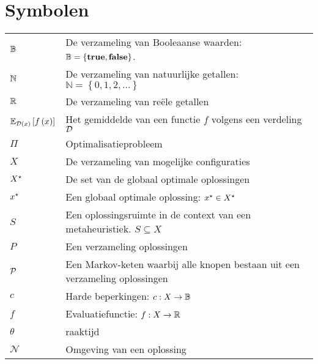 \documentclass[master=elt,masteroption=ge]{kulemt}
\begin{document}
\section*{Symbolen}
\begin{flushleft}
  \renewcommand{\arraystretch}{1.1}
  \begin{tabularx}{\textwidth}{@{}p{22mm}X@{}}
    $\BBB$					& De verzameling van Booleaanse waarden: $\mathbb{B}=\left\{\mbox{\textbf{true}},\mbox{\textbf{false}}\right\}$. \\
    $\NNN$					& De verzameling van natuurlijke getallen: $\mathbb{N}=\left\{0,1,2,\ldots\right\}$ \\
    $\RRR$					& De verzameling van re\"ele getallen\\
    $\mean[\fun{\calD}{x}]{\fun{f}{x}}$	& Het gemiddelde van een functie $f$ volgens een verdeling $\calD$\\%
    $\Pi$					& Optimalisatieprobleem\\
    $X$						& De verzameling van mogelijke configuraties\\
    $\Xop$					& De set van de globaal optimale oplossingen\\
    $\xstar$					& Een globaal optimale oplossing: $\xstar\in\Xop$\\
    $S$						& Een oplossingsruimte in de context van een metaheuristiek. $S\subseteq X$\\
    $P$						& Een verzameling oplossingen\\
    $\calP$					& Een Markov-keten waarbij alle knopen bestaan uit een verzameling oplossingen\\
    $c$						& Harde beperkingen: $c:X\rightarrow\BBB$\\
    $f$						& Evaluatiefunctie: $f:X\rightarrow\RRR$\\
    $\theta$					& raaktijd\\
    $\mathcal{N}$				& Omgeving van een oplossing
  \end{tabularx}
\end{flushleft}

\mainmatter







\appendixpage*          %
\appendix



\backmatter


\end{document}

